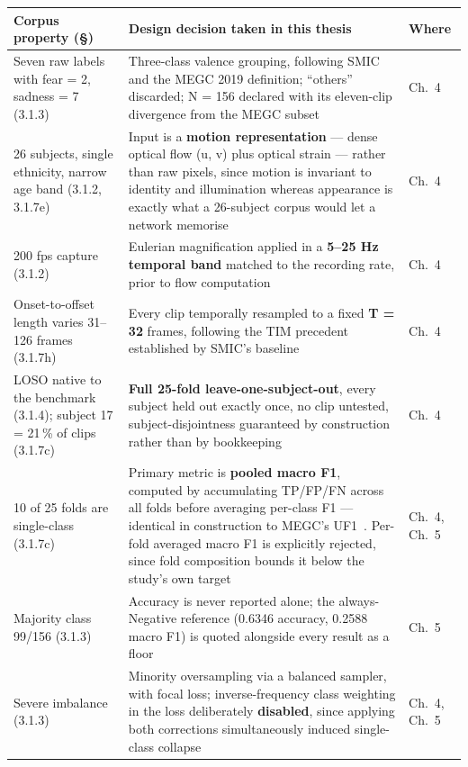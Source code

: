 \begin{table}[htbp]
	\centering
	\footnotesize
	\begin{tabular}{p{3.2cm} p{8.0cm} p{1.3cm}}
		\hline
		\textbf{Corpus property (\S)} & \textbf{Design decision taken in this thesis} & \textbf{Where} \\
		\hline
		Seven raw labels with fear = 2, sadness = 7 (3.1.3) & Three-class valence grouping, following SMIC and the MEGC 2019 definition; ``others'' discarded; N = 156 declared with its eleven-clip divergence from the MEGC subset & Ch.~4 \\
		26 subjects, single ethnicity, narrow age band (3.1.2, 3.1.7e) & Input is a \textbf{motion representation} --- dense optical flow (u, v) plus optical strain --- rather than raw pixels, since motion is invariant to identity and illumination whereas appearance is exactly what a 26-subject corpus would let a network memorise & Ch.~4 \\
		200 fps capture (3.1.2) & Eulerian magnification applied in a \textbf{5--25 Hz temporal band} matched to the recording rate, prior to flow computation & Ch.~4 \\
		Onset-to-offset length varies 31--126 frames (3.1.7h) & Every clip temporally resampled to a fixed \textbf{T = 32} frames, following the TIM precedent established by SMIC's baseline~\cite{liX2013} & Ch.~4 \\
		LOSO native to the benchmark (3.1.4); subject 17 = 21\,\% of clips (3.1.7c) & \textbf{Full 25-fold leave-one-subject-out}, every subject held out exactly once, no clip untested, subject-disjointness guaranteed by construction rather than by bookkeeping & Ch.~4 \\
		10 of 25 folds are single-class (3.1.7c) & Primary metric is \textbf{pooled macro F1}, computed by accumulating TP/FP/FN across all folds before averaging per-class F1 --- identical in construction to MEGC's UF1~\cite{see2019}. Per-fold averaged macro F1 is explicitly rejected, since fold composition bounds it below the study's own target & Ch.~4, Ch.~5 \\
		Majority class 99/156 (3.1.3) & Accuracy is never reported alone; the always-Negative reference (0.6346 accuracy, 0.2588 macro F1) is quoted alongside every result as a floor & Ch.~5 \\
		Severe imbalance (3.1.3) & Minority oversampling via a balanced sampler, with focal loss; inverse-frequency class weighting in the loss deliberately \textbf{disabled}, since applying both corrections simultaneously induced single-class collapse & Ch.~4, Ch.~5 \\

\end{tabular}
\end{table}
